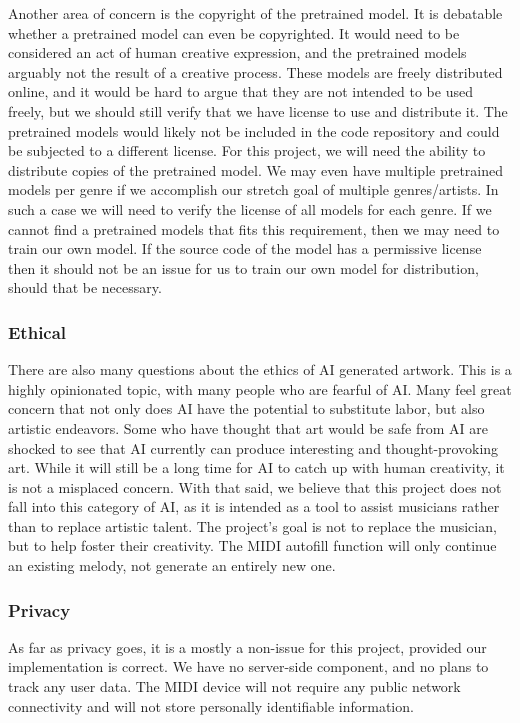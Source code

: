 Another area of concern is the copyright of the pretrained model. It is debatable whether
a pretrained model can even be copyrighted. It would need to be considered an act of
human creative expression, and the pretrained models arguably not the result of a creative
process. These models are freely distributed online, and it would be hard to argue that
they are not intended to be used freely, but we should still verify that we have license
to use and distribute it. The pretrained models would likely not be included in the code
repository and could be subjected to a different license. For this project, we will need
the ability to distribute copies of the pretrained model. We may even have multiple
pretrained models per genre if we accomplish our stretch goal of multiple genres/artists.
In such a case we will need to verify the license of all models for each genre. If we
cannot find a pretrained models that fits this requirement, then we may need to train our
own model. If the source code of the model has a permissive license then it should not be
an issue for us to train our own model for distribution, should that be necessary.

\subsubsection{Ethical}

There are also many questions about the ethics of AI generated artwork. This is a highly
opinionated topic, with many people who are fearful of AI. Many feel great concern that
not only does AI have the potential to substitute labor, but also artistic endeavors. Some
who have thought that art would be safe from AI are shocked to see that AI currently can
produce interesting and thought-provoking art. While it will still be a long time for AI
to catch up with human creativity, it is not a misplaced concern. With that said, we
believe that this project does not fall into this category of AI, as it is intended as a
tool to assist musicians rather than to replace artistic talent. The project’s goal is not
to replace the musician, but to help foster their creativity. The MIDI autofill function
will only continue an existing melody, not generate an entirely new one.

\subsubsection{Privacy}

As far as privacy goes, it is a mostly a non-issue for this project, provided our
implementation is correct. We have no server-side component, and no plans to track any
user data. The MIDI device will not require any public network connectivity and will not
store personally identifiable information.


